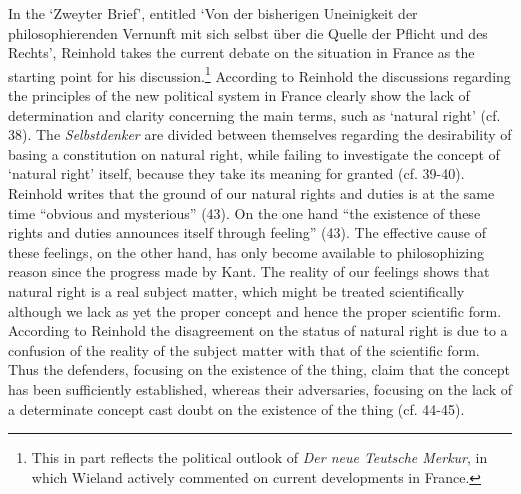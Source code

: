 In the `Zweyter Brief', entitled `Von der bisherigen Uneinigkeit der philosophierenden Vernunft mit sich selbst \"{u}ber die Quelle der Pflicht und des Rechts', Reinhold takes the current debate on the situation in France as the starting point for his discussion.\footnote{ This in part reflects the political outlook of \textit{Der neue Teutsche Merkur}, in which Wieland actively commented on current developments in France. } According to Reinhold the discussions regarding the principles of the new political system in France clearly show the lack of determination and clarity concerning the main terms, such as `natural right' (cf. 38). The \textit{Selbstdenker} are divided between themselves regarding the desirability of basing a constitution on natural right, while failing to investigate the concept of `natural right' itself, because they take its meaning for granted (cf. 39{-}40). Reinhold writes that the ground of our natural rights and duties is at the same time ``obvious and mysterious'' (43). On the one hand ``the existence of these rights and duties announces itself through feeling'' (43). The effective cause of these feelings, on the other hand, has only become available to philosophizing reason since the progress made by Kant. The reality of our feelings shows that natural right is a real subject matter, which might be treated scientifically although we lack as yet the proper concept and hence the proper scientific form. According to Reinhold the disagreement on the status of natural right is due to a confusion of the reality of the subject matter with that of the scientific form. Thus the defenders, focusing on the existence of the thing, claim that the concept has been sufficiently established, whereas their adversaries, focusing on the lack of a determinate concept cast doubt on the existence of the thing (cf. 44{-}45). 


